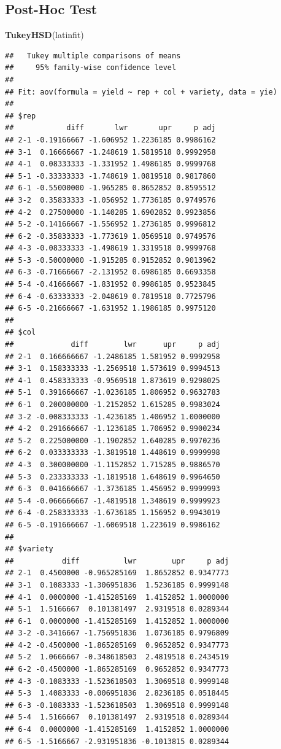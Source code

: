 \documentclass[
]{ctexart}
\newenvironment{Shaded}{\begin{snugshade}}{\end{snugshade}}
\newcommand{\FunctionTok}[1]{\textcolor[rgb]{0.13,0.29,0.53}{\textbf{#1}}}
\newcommand{\NormalTok}[1]{#1}
\begin{document}
\hypertarget{post-hoc-test-1}{%
\subsection{Post-Hoc Test}\label{post-hoc-test-1}}

\begin{Shaded}
\begin{Highlighting}[]
\FunctionTok{TukeyHSD}\NormalTok{(latinfit)}
\end{Highlighting}
\end{Shaded}

\begin{verbatim}
##   Tukey multiple comparisons of means
##     95% family-wise confidence level
## 
## Fit: aov(formula = yield ~ rep + col + variety, data = yie)
## 
## $rep
##            diff       lwr       upr     p adj
## 2-1 -0.19166667 -1.606952 1.2236185 0.9986162
## 3-1  0.16666667 -1.248619 1.5819518 0.9992958
## 4-1  0.08333333 -1.331952 1.4986185 0.9999768
## 5-1 -0.33333333 -1.748619 1.0819518 0.9817860
## 6-1 -0.55000000 -1.965285 0.8652852 0.8595512
## 3-2  0.35833333 -1.056952 1.7736185 0.9749576
## 4-2  0.27500000 -1.140285 1.6902852 0.9923856
## 5-2 -0.14166667 -1.556952 1.2736185 0.9996812
## 6-2 -0.35833333 -1.773619 1.0569518 0.9749576
## 4-3 -0.08333333 -1.498619 1.3319518 0.9999768
## 5-3 -0.50000000 -1.915285 0.9152852 0.9013962
## 6-3 -0.71666667 -2.131952 0.6986185 0.6693358
## 5-4 -0.41666667 -1.831952 0.9986185 0.9523845
## 6-4 -0.63333333 -2.048619 0.7819518 0.7725796
## 6-5 -0.21666667 -1.631952 1.1986185 0.9975120
## 
## $col
##             diff        lwr      upr     p adj
## 2-1  0.166666667 -1.2486185 1.581952 0.9992958
## 3-1  0.158333333 -1.2569518 1.573619 0.9994513
## 4-1  0.458333333 -0.9569518 1.873619 0.9298025
## 5-1  0.391666667 -1.0236185 1.806952 0.9632783
## 6-1  0.200000000 -1.2152852 1.615285 0.9983024
## 3-2 -0.008333333 -1.4236185 1.406952 1.0000000
## 4-2  0.291666667 -1.1236185 1.706952 0.9900234
## 5-2  0.225000000 -1.1902852 1.640285 0.9970236
## 6-2  0.033333333 -1.3819518 1.448619 0.9999998
## 4-3  0.300000000 -1.1152852 1.715285 0.9886570
## 5-3  0.233333333 -1.1819518 1.648619 0.9964650
## 6-3  0.041666667 -1.3736185 1.456952 0.9999993
## 5-4 -0.066666667 -1.4819518 1.348619 0.9999923
## 6-4 -0.258333333 -1.6736185 1.156952 0.9943019
## 6-5 -0.191666667 -1.6069518 1.223619 0.9986162
## 
## $variety
##           diff          lwr        upr     p adj
## 2-1  0.4500000 -0.965285169  1.8652852 0.9347773
## 3-1  0.1083333 -1.306951836  1.5236185 0.9999148
## 4-1  0.0000000 -1.415285169  1.4152852 1.0000000
## 5-1  1.5166667  0.101381497  2.9319518 0.0289344
## 6-1  0.0000000 -1.415285169  1.4152852 1.0000000
## 3-2 -0.3416667 -1.756951836  1.0736185 0.9796809
## 4-2 -0.4500000 -1.865285169  0.9652852 0.9347773
## 5-2  1.0666667 -0.348618503  2.4819518 0.2434519
## 6-2 -0.4500000 -1.865285169  0.9652852 0.9347773
## 4-3 -0.1083333 -1.523618503  1.3069518 0.9999148
## 5-3  1.4083333 -0.006951836  2.8236185 0.0518445
## 6-3 -0.1083333 -1.523618503  1.3069518 0.9999148
## 5-4  1.5166667  0.101381497  2.9319518 0.0289344
## 6-4  0.0000000 -1.415285169  1.4152852 1.0000000
## 6-5 -1.5166667 -2.931951836 -0.1013815 0.0289344
\end{verbatim}
\end{document}
